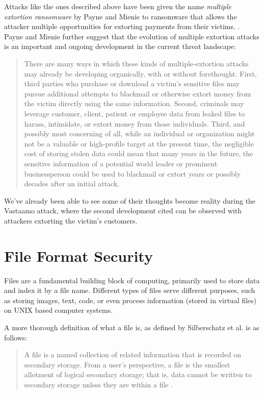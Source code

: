 Attacks like the ones described above have been given the name \emph{multiple extortion ransomware} by Payne and
Mienie to ransomware that allows the attacker multiple opportunities for extorting payments from their victims.
\cite{multiple-extortion-ransomware}.
Payne and Mienie further suggest that the evolution of multiple extortion attacks is an important and ongoing
development in the current threat landscape:
\begin{quote}
  There are many ways in which these kinds of multiple-extortion attacks may already be developing organically,
  with or without forethought. First, third parties who purchase or download a victim's sensitive files may pursue
  additional attempts to blackmail or otherwise extort money from the victim directly using the same information.
  Second, criminals may leverage customer, client, patient or employee data from leaked files to harass,
  intimidate, or extort money from those individuals. Third, and possibly most concerning of all, while an individual
  or organization might not be a valuable or high-profile target at the present time, the negligible cost of storing
  stolen data could mean that many years in the future, the sensitive information of a potential world leader or
  prominent businessperson could be used to blackmail or extort years or possibly decades after an initial attack.
  \cite{multiple-extortion-ransomware} 
\end{quote}
We've already been able to see some of their thoughts become reality during the Vastaamo attack, where the second
development cited can be observed with attackers extorting the victim's customers.

\section{File Format Security}
Files are a fundamental building block of computing, primarily used to store data and index it by a file name.
Different types of files serve different purposes, such as storing images, text, code, or even process 
information (stored in virtual files) on UNIX based computer systems.

A more thorough definition of what a file is, as defined by Silberschatz et al. is as follows:
\begin{quote}
  A file is a named collection of related information that is recorded on secondary storage. From a user's perspective, 
  a file is the smallest allotment of logical secondary storage; that is, data cannot be written to secondary storage 
  unless they are within a file \cite[p.~422]{operating-system-concepts}.
\end{quote}

